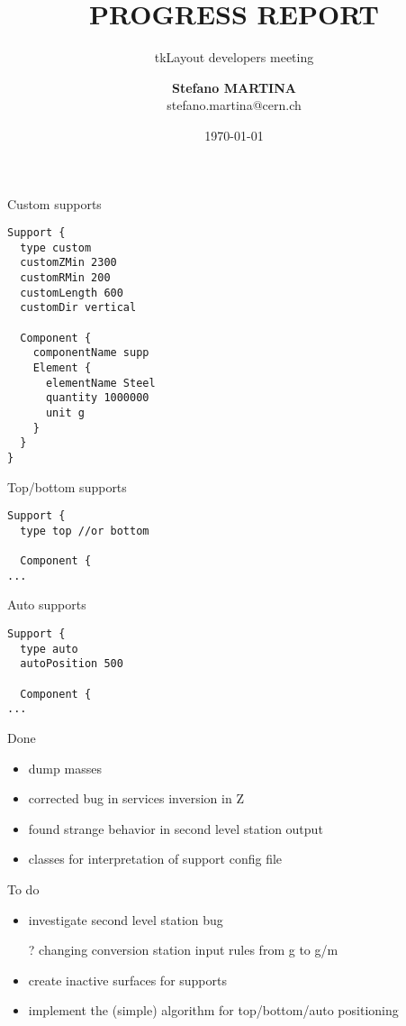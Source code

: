 \documentclass[pdftex, 11pt]{beamer}
\title[Progress report]{\textbf{PROGRESS REPORT}}
\subtitle{tkLayout developers meeting}
\institute[CERN]{
  European Organization for Nuclear Research\\[0.5cm]
  \texttt{[image: img/LogoBadge.pdf]}\\
}
\author[Stefano Martina]{
  \textbf{Stefano MARTINA}\\
  {\small stefano.martina@cern.ch}
}
\date[\today]{\flushright \today}
\begin{document}
\begin{frame}
  \titlepage
\end{frame}

\begin{frame}[fragile]
  \begin{block}{Custom supports}
\begin{verbatim}
Support {
  type custom
  customZMin 2300
  customRMin 200
  customLength 600
  customDir vertical
    
  Component {
    componentName supp
    Element {
      elementName Steel
      quantity 1000000
      unit g
    }
  }
}  
\end{verbatim}
  \end{block}
\end{frame}

\begin{frame}[fragile]
  \begin{block}{Top/bottom supports}
\begin{verbatim}
Support {
  type top //or bottom
    
  Component {
...
\end{verbatim}
  \end{block}

  \begin{block}{Auto supports}
\begin{verbatim}
Support {
  type auto
  autoPosition 500
    
  Component {
...
\end{verbatim}
  \end{block}  
\end{frame}

\begin{frame}
  \begin{block}{Done}
    \begin{itemize}
    \item \alert{dump} masses
    \item \alert{corrected} bug in services inversion in Z
    \item found \alert{strange behavior} in second level station output
    \item classes for interpretation of support \alert{config} file
    \end{itemize}    
  \end{block}

  \begin{block}{To do}
    \begin{itemize}
    \item \alert{investigate} second level station bug
    \item[?] changing conversion station input rules from \alert{g} to \alert{g/m}
    \item \alert{create} inactive surfaces for supports
    \item implement the (simple) \alert{algorithm} for top/bottom/auto positioning
    \end{itemize}
  \end{block}
\end{frame}
\end{document}
